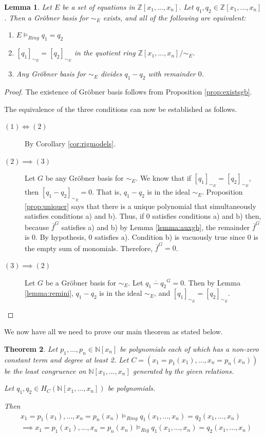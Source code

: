 \documentclass{msthesis}
\newtheorem{theorem}{Theorem}[section]
\newtheorem{lemma}[theorem]{Lemma}
\theoremstyle{definition}
\newcommand{\ints}{\mathbb{Z}}
\newcommand{\nat}{\mathbb{N}}
\begin{document}
\begin{lemma}
    Let $E$ be a set of equations in $\ints[x_1,..., x_n]$.  Let $q_1, q_2 \in \ints[x_1, ..., x_n]$.
    Then a Gr\"obner basis for $\sim_E$ exists, and all of the following are equivalent:
    \begin{enumerate}[label=(\arabic*),nosep]
        \item $E \models_{Ring} q_1 = q_2$
        \item $[q_1]_{\sim_{E}} = [q_2]_{\sim_{E}}$ in the quotient ring $\ints[x_1, ..., x_n]/\sim_{E}$.
        \item Any Gr\"obner basis for $\sim_E$ divides $q_1 - q_2$ with remainder $0$. \qedhere
    \end{enumerate}
\end{lemma}
\begin{proof}
    The existence of Gr\"obner basis follows from Proposition \ref{prop:existsgb}.

    The equivalence of the three conditions can now be established as follows.
    \begin{description}
        \item[$(1) \iff (2)$] By Corollary \ref{cor:rigmodels}.
        \item[$(2) \implies (3)$] Let $G$ be any Gr\"obner basis for $\sim_E$.  We know that if $[q_1]_{\sim_E} = [q_2]_{\sim_E}$, then $[q_1 - q_2]_{\sim_E} = 0$.  That is, $q_1 - q_2$ is in the ideal $\sim_E$.  Proposition \ref{prop:uniquer} says that there is a unique polynomial that simultaneously satisfies conditions a) and b).  Thus, if $0$ satisfies conditions a) and b) then, because $\overline{f}^G$ satisfies a) and b) by Lemma \ref{lemma:auxgb}, the remainder $\overline{f}^G$ is $0$.  By hypothesis, $0$ satisfies a).  Condition b) is vacuously true since $0$ is the empty sum of monomials.  Therefore, $\overline{f}^G = 0$.
        \item[$(3) \implies (2)$] Let $G$ be a Gr\"obner basis for $\sim_E$.  Let $\overline{q_1 - q_2}^G = 0$.  Then by Lemma \ref{lemma:remini}, $q_1 - q_2$ is in the ideal $\sim_E$, and $[q_1]_{\sim_E} = [q_2]_{\sim_E}$. \qedhere
    \end{description}
\end{proof}

We now have all we need to prove our main theorem as stated below.

\begin{theorem}\label{thm:mvringtorig}
    Let $p_1, \dots, p_n \in \nat[x_n]$ be polynomials each of which has a non-zero constant term and degree at least 2.  Let $C = (x_1 = p_1(x_1), ..., x_n = p_n(x_n))$ be the least congruence on $\nat[x_1, ..., x_n]$ generated by the given relations.

    Let $q_1, q_2 \in H_C(\nat[x_1, ..., x_n])$ be polynomials.

    Then 
    \begin{align*}
    &x_1 = p_1(x_1), ..., x_n = p_n(x_n) \models_{Ring} q_1(x_1, ..., x_n) = q_2(x_1, ..., x_n) \\
    &\implies 
    x_1 = p_1(x_1), ..., x_n = p_n(x_n) \models_{Rig} q_1(x_1, ..., x_n) = q_2(x_1, ..., x_n)
    \end{align*}
\end{theorem}
\end{document}
